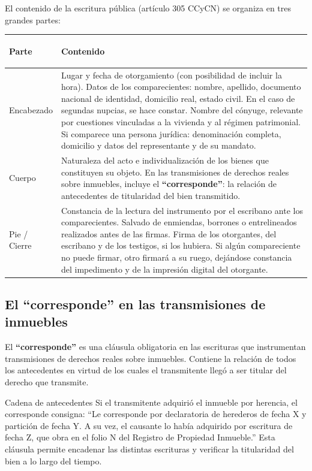 \documentclass[12pt,oneside]{book}
\begin{document}
El contenido de la escritura pública (artículo 305 CCyCN) se organiza en tres grandes partes:

\begin{table}[H]
\centering
\begin{tabularx}{\textwidth}{>{\bfseries\raggedright\arraybackslash}p{}
                              >{\raggedright\arraybackslash}X}
\toprule
Parte & Contenido \\
\midrule
Encabezado & Lugar y fecha de otorgamiento (con posibilidad de incluir la hora). Datos de los comparecientes: nombre, apellido, documento nacional de identidad, domicilio real, estado civil. En el caso de segundas nupcias, se hace constar. Nombre del cónyuge, relevante por cuestiones vinculadas a la vivienda y al régimen patrimonial. Si comparece una persona jurídica: denominación completa, domicilio y datos del representante y de su mandato. \\[4pt]
Cuerpo & Naturaleza del acto e individualización de los bienes que constituyen su objeto. En las transmisiones de derechos reales sobre inmuebles, incluye el \textbf{``corresponde''}: la relación de antecedentes de titularidad del bien transmitido. \\[4pt]
Pie / Cierre & Constancia de la lectura del instrumento por el escribano ante los comparecientes. Salvado de enmiendas, borrones o entrelineados realizados antes de las firmas. Firma de los otorgantes, del escribano y de los testigos, si los hubiera. Si algún compareciente no puede firmar, otro firmará a su ruego, dejándose constancia del impedimento y de la impresión digital del otorgante. \\
\bottomrule
\end{tabularx}
\end{table}

\subsection{El ``corresponde'' en las transmisiones de inmuebles}

El \textbf{``corresponde''} es una cláusula obligatoria en las escrituras que instrumentan transmisiones de derechos reales sobre inmuebles. Contiene la relación de todos los antecedentes en virtud de los cuales el transmitente llegó a ser titular del derecho que transmite.

\begin{example}{Cadena de antecedentes}
Si el transmitente adquirió el inmueble por herencia, el corresponde consigna: ``Le corresponde por declaratoria de herederos de fecha X y partición de fecha Y. A su vez, el causante lo había adquirido por escritura de fecha Z, que obra en el folio N del Registro de Propiedad Inmueble.'' Esta cláusula permite encadenar las distintas escrituras y verificar la titularidad del bien a lo largo del tiempo.
\end{example}
\end{document}
